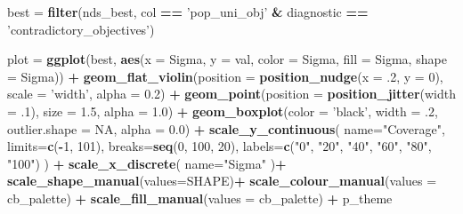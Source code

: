 \documentclass[]{book}
\newenvironment{Shaded}{\begin{snugshade}}{\end{snugshade}}
\newcommand{\DataTypeTok}[1]{\textcolor[rgb]{0.13,0.29,0.53}{#1}}
\newcommand{\DecValTok}[1]{\textcolor[rgb]{0.00,0.00,0.81}{#1}}
\newcommand{\FloatTok}[1]{\textcolor[rgb]{0.00,0.00,0.81}{#1}}
\newcommand{\KeywordTok}[1]{\textcolor[rgb]{0.13,0.29,0.53}{\textbf{#1}}}
\newcommand{\NormalTok}[1]{#1}
\newcommand{\OperatorTok}[1]{\textcolor[rgb]{0.81,0.36,0.00}{\textbf{#1}}}
\newcommand{\OtherTok}[1]{\textcolor[rgb]{0.56,0.35,0.01}{#1}}
\newcommand{\StringTok}[1]{\textcolor[rgb]{0.31,0.60,0.02}{#1}}
\begin{document}
\begin{Shaded}
\begin{Highlighting}[]
\NormalTok{best =}\StringTok{ }\KeywordTok{filter}\NormalTok{(nds_best, col }\OperatorTok{==}\StringTok{ 'pop_uni_obj'} \OperatorTok{&}\StringTok{ }\NormalTok{diagnostic }\OperatorTok{==}\StringTok{ 'contradictory_objectives'}\NormalTok{)}

\NormalTok{plot =}\StringTok{ }\KeywordTok{ggplot}\NormalTok{(best, }\KeywordTok{aes}\NormalTok{(}\DataTypeTok{x =}\NormalTok{ Sigma, }\DataTypeTok{y =}\NormalTok{ val, }\DataTypeTok{color =}\NormalTok{ Sigma, }\DataTypeTok{fill =}\NormalTok{ Sigma, }\DataTypeTok{shape =}\NormalTok{ Sigma)) }\OperatorTok{+}
\StringTok{  }\KeywordTok{geom_flat_violin}\NormalTok{(}\DataTypeTok{position =} \KeywordTok{position_nudge}\NormalTok{(}\DataTypeTok{x =} \FloatTok{.2}\NormalTok{, }\DataTypeTok{y =} \DecValTok{0}\NormalTok{), }\DataTypeTok{scale =} \StringTok{'width'}\NormalTok{, }\DataTypeTok{alpha =} \FloatTok{0.2}\NormalTok{) }\OperatorTok{+}
\StringTok{  }\KeywordTok{geom_point}\NormalTok{(}\DataTypeTok{position =} \KeywordTok{position_jitter}\NormalTok{(}\DataTypeTok{width =} \FloatTok{.1}\NormalTok{), }\DataTypeTok{size =} \FloatTok{1.5}\NormalTok{, }\DataTypeTok{alpha =} \FloatTok{1.0}\NormalTok{) }\OperatorTok{+}
\StringTok{  }\KeywordTok{geom_boxplot}\NormalTok{(}\DataTypeTok{color =} \StringTok{'black'}\NormalTok{, }\DataTypeTok{width =} \FloatTok{.2}\NormalTok{, }\DataTypeTok{outlier.shape =} \OtherTok{NA}\NormalTok{, }\DataTypeTok{alpha =} \FloatTok{0.0}\NormalTok{) }\OperatorTok{+}
\StringTok{  }\KeywordTok{scale_y_continuous}\NormalTok{(}
    \DataTypeTok{name=}\StringTok{"Coverage"}\NormalTok{,}
    \DataTypeTok{limits=}\KeywordTok{c}\NormalTok{(}\OperatorTok{-}\DecValTok{1}\NormalTok{, }\DecValTok{101}\NormalTok{),}
    \DataTypeTok{breaks=}\KeywordTok{seq}\NormalTok{(}\DecValTok{0}\NormalTok{, }\DecValTok{100}\NormalTok{, }\DecValTok{20}\NormalTok{),}
    \DataTypeTok{labels=}\KeywordTok{c}\NormalTok{(}\StringTok{"0"}\NormalTok{, }\StringTok{"20"}\NormalTok{, }\StringTok{"40"}\NormalTok{, }\StringTok{"60"}\NormalTok{, }\StringTok{"80"}\NormalTok{, }\StringTok{"100"}\NormalTok{)}
\NormalTok{  ) }\OperatorTok{+}
\StringTok{  }\KeywordTok{scale_x_discrete}\NormalTok{(}
    \DataTypeTok{name=}\StringTok{"Sigma"}
\NormalTok{  )}\OperatorTok{+}
\StringTok{  }\KeywordTok{scale_shape_manual}\NormalTok{(}\DataTypeTok{values=}\NormalTok{SHAPE)}\OperatorTok{+}
\StringTok{  }\KeywordTok{scale_colour_manual}\NormalTok{(}\DataTypeTok{values =}\NormalTok{ cb_palette) }\OperatorTok{+}
\StringTok{  }\KeywordTok{scale_fill_manual}\NormalTok{(}\DataTypeTok{values =}\NormalTok{ cb_palette) }\OperatorTok{+}
\StringTok{  }\NormalTok{p_theme}


\end{Highlighting}
\end{Shaded}
\end{document}
